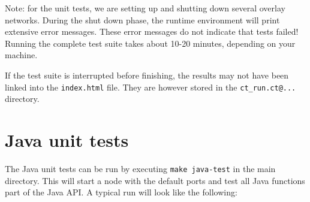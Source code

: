 \documentclass[a4paper]{scrreprt}
\newcommand{\code}[1]{\lstinline[basicstyle=\ttfamily]!#1!}
\begin{document}
Note: for the unit tests, we are setting up and shutting down several
overlay networks. During the shut down phase, the runtime environment
will print extensive error messages. These error messages do not
indicate that tests failed! Running the complete test suite takes
about 10-20 minutes, depending on your machine.

If the test suite is interrupted before finishing, the results may not have
been linked into the \code{index.html} file. They are however stored in the
\code{ct_run.ct@...} directory.

\section{Java unit tests}
The Java unit tests can be run by executing \code{make java-test} in the main
directory. This will start a \scalaris{} node with the default ports and test
all Java functions part of the Java API. A typical run will look like the
following:
\end{document}
